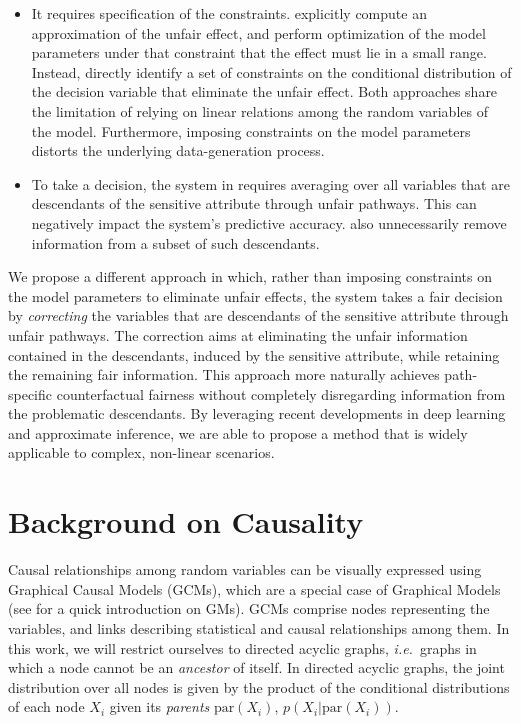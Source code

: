 \documentclass{article}
\newcommand{\ie}{\emph{i.e.}}
\begin{document}
\begin{itemize}[leftmargin=*]
\item It requires specification of the constraints. \citet{nabi18fair} explicitly compute an approximation of the unfair effect, and perform optimization of the model parameters under that constraint that the effect must lie in a small range.
Instead, \citet{kilbertus17avoiding} directly identify a set of constraints on the conditional distribution of the decision variable that eliminate the unfair effect. Both approaches share the limitation of relying on linear relations among the random variables of the model.
Furthermore, imposing constraints on the model parameters distorts the underlying data-generation process.\\[-10pt]
\item To take a decision, the system in \citet{nabi18fair} requires averaging over all variables that are descendants of the sensitive attribute through unfair pathways.
This can negatively impact the system's predictive accuracy. 
\citet{kilbertus17avoiding} also unnecessarily remove information from a subset of such descendants.\\[-14pt]
\end{itemize}
We propose a different approach in which, rather than imposing constraints on the model parameters to eliminate unfair effects, 
the system takes a fair decision by \emph{correcting} the variables that are descendants of the sensitive attribute through unfair pathways. 
The correction aims at eliminating the unfair information contained in the descendants, induced by the sensitive attribute, while retaining the remaining fair information.
This approach more naturally achieves path-specific counterfactual fairness without completely disregarding information from the problematic descendants.
By leveraging recent developments in deep learning and approximate inference, we are able to propose a method that is widely applicable to complex, non-linear scenarios.

\section{Background on Causality}
Causal relationships among random variables can be visually expressed using Graphical Causal Models (GCMs), which are a special case of Graphical Models (see \citet{chiappa14explicit} for a quick introduction on GMs). 
GCMs comprise nodes representing the variables, and links describing statistical and causal relationships among them. In this work, we will restrict ourselves to directed acyclic graphs, 
\ie~graphs in which a node cannot be an \emph{ancestor} of itself. In directed acyclic graphs, the joint distribution over all nodes is given by the product of the conditional distributions of each node $X_i$ given its \emph{parents} $\textrm{par}(X_i)$,  $p(X_i|\textrm{par}(X_i))$. %
\end{document}
